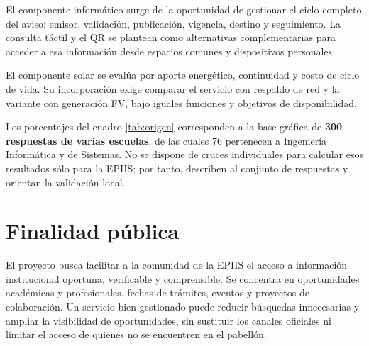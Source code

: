 El componente informático surge de la oportunidad de gestionar el ciclo completo del aviso: emisor, validación, publicación, vigencia, destino y seguimiento. La consulta táctil y el QR se plantean como alternativas complementarias para acceder a esa información desde espacios comunes y dispositivos personales.

El componente solar se evalúa por aporte energético, continuidad y costo de ciclo de vida. Su incorporación exige comparar el servicio con respaldo de red y la variante con generación FV, bajo iguales funciones y objetivos de disponibilidad.

Los porcentajes del cuadro \ref{tab:origen} corresponden a la base gráfica de \textbf{300 respuestas de varias escuelas}, de las cuales 76 pertenecen a Ingeniería Informática y de Sistemas. No se dispone de cruces individuales para calcular esos resultados sólo para la EPIIS; por tanto, describen al conjunto de respuestas y orientan la validación local.


\section{Finalidad pública}

El proyecto busca facilitar a la comunidad de la EPIIS el acceso a información institucional oportuna, verificable y comprensible. Se concentra en oportunidades académicas y profesionales, fechas de trámites, eventos y proyectos de colaboración. Un servicio bien gestionado puede reducir búsquedas innecesarias y ampliar la visibilidad de oportunidades, sin sustituir los canales oficiales ni limitar el acceso de quienes no se encuentren en el pabellón.

